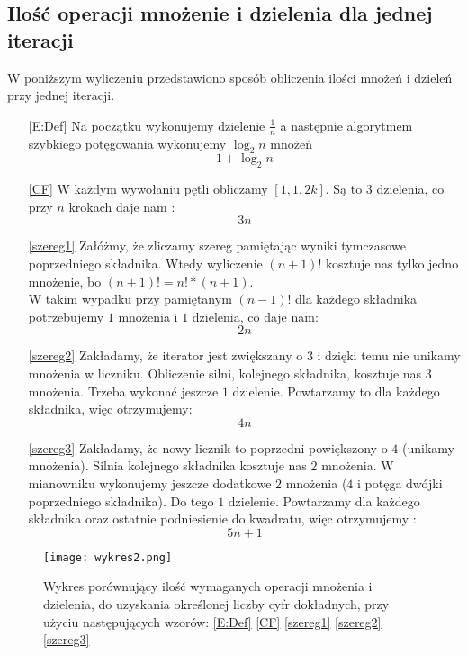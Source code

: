 \documentclass{article}
\begin{document}
\subsection{Ilość operacji mnożenie i dzielenia dla jednej iteracji}
	W poniższym wyliczeniu przedstawiono sposób obliczenia ilości mnożeń i dzieleń przy jednej iteracji. 
	\begin{enumerate}
		\item [\ref{E:Def}] Na początku wykonujemy dzielenie $\frac{1}{n}$ a następnie algorytmem szybkiego potęgowania wykonujemy $\log_{2}{n}$ mnożeń
		$$1+\log_{2}{n}$$
		
		\item [\ref{CF}] W każdym wywołaniu pętli obliczamy $[1,1,2k]$. Są to $3$ dzielenia, co przy $n$ krokach daje nam :
		$$3n$$
		
		\item [\ref{szereg1}]  Załóżmy, że zliczamy szereg pamiętając wyniki tymczasowe poprzedniego składnika. Wtedy wyliczenie $(n+1)!$ kosztuje nas tylko jedno mnożenie, bo $(n+1)! = n! * (n+1)$.
		\\ W takim wypadku przy pamiętanym $(n-1)!$ dla każdego składnika potrzebujemy $1$ mnożenia i $1$ dzielenia, co daje nam:
		$$2n$$
		
		\item [\ref{szereg2}] Zakładamy, że iterator jest zwiększany o $3$ i dzięki temu nie unikamy mnożenia w liczniku. Obliczenie silni, kolejnego składnika, kosztuje nas $3$ mnożenia. Trzeba wykonać jeszcze $1$ dzielenie. Powtarzamy to dla każdego składnika, więc otrzymujemy:
		$$4n$$
		
		\item[\ref{szereg3}] Zakładamy, że nowy licznik to poprzedni powiększony o $4$ (unikamy mnożenia). Silnia kolejnego składnika kosztuje nas  $2$ mnożenia. W mianowniku wykonujemy jeszcze dodatkowe $2$ mnożenia ($4$ i potęga dwójki poprzedniego składnika). Do tego $1$ dzielenie. Powtarzamy dla każdego składnika oraz ostatnie podniesienie do kwadratu, więc otrzymujemy :
		$$5n + 1$$
	\end{enumerate}
\begin{figure}[h]
	\centering
	\texttt{[image: wykres2.png]}
	\caption{Wykres porównujący ilość wymaganych operacji mnożenia i dzielenia, do uzyskania określonej liczby cyfr dokładnych, przy użyciu następujących wzorów: \eqref{E:Def} \eqref{CF} \eqref{szereg1} \eqref{szereg2} \eqref{szereg3}}
	\label{W2}
\end{figure}
\end{document}
